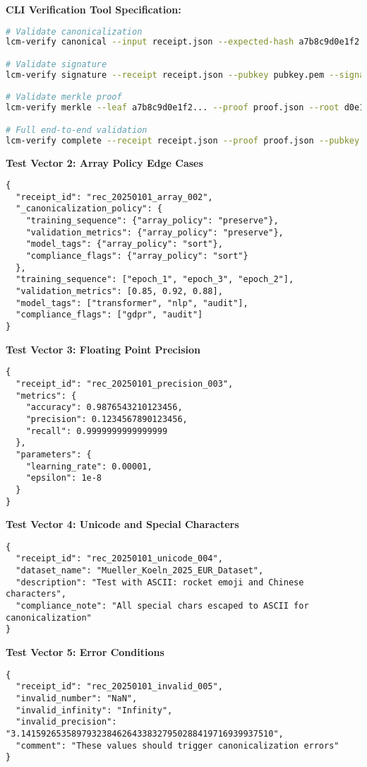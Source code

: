 \documentclass[12pt,a4paper]{article}
\begin{document}
\textbf{CLI Verification Tool Specification:}
\begin{lstlisting}[language=bash, caption=Conformance Validation Commands]
# Validate canonicalization
lcm-verify canonical --input receipt.json --expected-hash a7b8c9d0e1f2...

# Validate signature
lcm-verify signature --receipt receipt.json --pubkey pubkey.pem --signature 1a2b3c4d5e6f...

# Validate merkle proof
lcm-verify merkle --leaf a7b8c9d0e1f2... --proof proof.json --root d0e1f2a3b4c5...

# Full end-to-end validation
lcm-verify complete --receipt receipt.json --proof proof.json --pubkey pubkey.pem
\end{lstlisting}

\textbf{Test Vector 2: Array Policy Edge Cases}
\begin{lstlisting}[caption=Array Policy Test Input]
{
  "receipt_id": "rec_20250101_array_002",
  "_canonicalization_policy": {
    "training_sequence": {"array_policy": "preserve"},
    "validation_metrics": {"array_policy": "preserve"},
    "model_tags": {"array_policy": "sort"},
    "compliance_flags": {"array_policy": "sort"}
  },
  "training_sequence": ["epoch_1", "epoch_3", "epoch_2"],
  "validation_metrics": [0.85, 0.92, 0.88],
  "model_tags": ["transformer", "nlp", "audit"],
  "compliance_flags": ["gdpr", "audit"]
}
\end{lstlisting}

\textbf{Test Vector 3: Floating Point Precision}
\begin{lstlisting}[caption=Precision Test Input]
{
  "receipt_id": "rec_20250101_precision_003",
  "metrics": {
    "accuracy": 0.9876543210123456,
    "precision": 0.1234567890123456,
    "recall": 0.9999999999999999
  },
  "parameters": {
    "learning_rate": 0.00001,
    "epsilon": 1e-8
  }
}
\end{lstlisting}

\textbf{Test Vector 4: Unicode and Special Characters}
\begin{lstlisting}[caption=Unicode Handling Test]
{
  "receipt_id": "rec_20250101_unicode_004",
  "dataset_name": "Mueller_Koeln_2025_EUR_Dataset",
  "description": "Test with ASCII: rocket emoji and Chinese characters",
  "compliance_note": "All special chars escaped to ASCII for canonicalization"
}
\end{lstlisting}

\textbf{Test Vector 5: Error Conditions}
\begin{lstlisting}[caption=Invalid Input (Should Fail)]
{
  "receipt_id": "rec_20250101_invalid_005",
  "invalid_number": "NaN",
  "invalid_infinity": "Infinity", 
  "invalid_precision": "3.14159265358979323846264338327950288419716939937510",
  "comment": "These values should trigger canonicalization errors"
}
\end{lstlisting}
\end{document}
